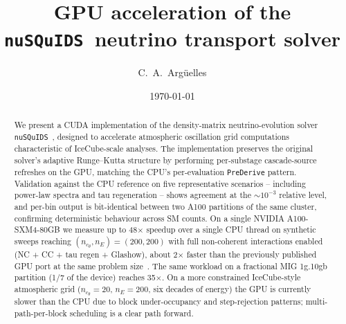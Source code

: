 \documentclass[aps,prd,reprint,nofootinbib,superscriptaddress,floatfix]{revtex4-2}
\newcommand{\nusquids}{\texttt{nuSQuIDS}\xspace}
\begin{document}
\title{GPU acceleration of the \nusquids\ neutrino transport solver}

\author{C.~A.~Arg\"uelles}

\date{\today}

\begin{abstract}
We present a CUDA implementation of the density-matrix neutrino-evolution
solver \nusquids~\cite{nusquids2021}, designed to accelerate atmospheric
oscillation grid computations characteristic of IceCube-scale analyses.
The implementation preserves the original solver's adaptive Runge--Kutta
structure by performing per-substage cascade-source refreshes on the GPU,
matching the CPU's per-evaluation \texttt{PreDerive} pattern. Validation
against the CPU reference on five representative scenarios -- including
power-law spectra and tau regeneration -- shows agreement at the
$\sim\!10^{-3}$ relative level, and per-bin output is bit-identical
between two A100 partitions of the same cluster, confirming
deterministic behaviour across SM counts. On a single NVIDIA
A100-SXM4-80GB we measure up to 48$\times$ speedup over a single
CPU thread on synthetic sweeps reaching $(n_{c_\theta}, n_E) = (200, 200)$
with full non-coherent interactions enabled (NC + CC + tau regen +
Glashow), about 2$\times$ faster than the previously published GPU
port at the same problem size~\cite{kallenborn2019}. The same
workload on a fractional MIG 1g.10gb partition (1/7 of the device)
reaches 35$\times$. On a more constrained IceCube-style
atmospheric grid ($n_{c_\theta}\!=\!20$, $n_E\!=\!200$, six decades
of energy) the GPU is currently slower than the CPU due to block
under-occupancy and step-rejection patterns; multi-path-per-block
scheduling is a clear path forward.
\end{abstract}

\maketitle









\end{document}
